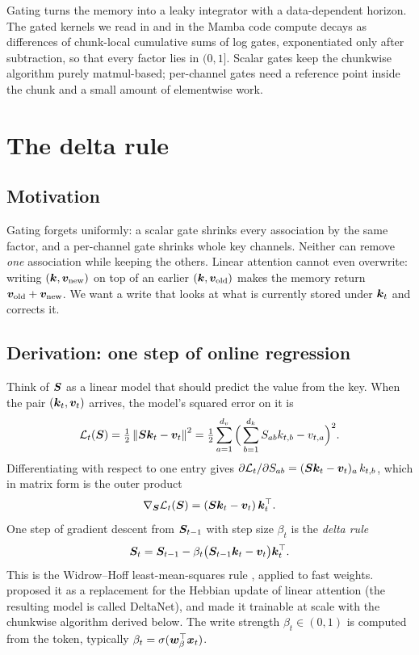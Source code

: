 \begin{keyidea}
Gating turns the memory into a leaky integrator with a data-dependent horizon. The gated kernels
we read in \fla{} and in the Mamba code compute decays as differences of chunk-local cumulative
sums of log gates, exponentiated only after subtraction, so that every factor lies in $(0,1]$. Scalar gates keep
the chunkwise algorithm purely matmul-based; per-channel gates need a reference point inside the
chunk and a small amount of elementwise work.
\end{keyidea}

\section{The delta rule}\label{sec:c03-delta}

\subsection{Motivation}

Gating forgets uniformly: a scalar gate shrinks every association by the same factor, and a
per-channel gate shrinks whole key channels. Neither can remove \emph{one} association while
keeping the others. Linear attention cannot even overwrite: writing $(\bm{k},\bm{v}_{\text{new}})$ on
top of an earlier $(\bm{k},\bm{v}_{\text{old}})$ makes the memory return $\bm{v}_{\text{old}}+\bm{v}_{\text{new}}$.
We want a write that looks at what is currently stored under $\bm{k}_t$ and corrects it.

\subsection{Derivation: one step of online regression}

Think of $\bm{S}$ as a linear model that should predict the value from the key. When the pair
$(\bm{k}_t,\bm{v}_t)$ arrives, the model's squared error on it is
\begin{equation}\label{eq:c03-delta-loss}
  \mathcal{L}_t(\bm{S})=\tfrac12\left\lVert \bm{S}\bm{k}_t-\bm{v}_t\right\rVert^2
  =\tfrac12\sum_{a=1}^{d_v}\Big(\sum_{b=1}^{d_k}S_{ab}k_{t,b}-v_{t,a}\Big)^2 .
\end{equation}
Differentiating with respect to one entry gives
$\partial\mathcal{L}_t/\partial S_{ab}=(\bm{S}\bm{k}_t-\bm{v}_t)_a\,k_{t,b}$, which in matrix form is the outer
product
\[
  \nabla_{\bm{S}}\mathcal{L}_t(\bm{S})=(\bm{S}\bm{k}_t-\bm{v}_t)\,\bm{k}_t^{\top} .
\]
One step of gradient descent from $\bm{S}_{t-1}$ with step size $\beta_t$ is the \emph{delta rule}
\begin{equation}\label{eq:c03-delta}
  \bm{S}_t=\bm{S}_{t-1}-\beta_t\big(\bm{S}_{t-1}\bm{k}_t-\bm{v}_t\big)\bm{k}_t^{\top} .
\end{equation}
This is the Widrow--Hoff least-mean-squares rule \citep{c02-widrow1960adaptive}, applied to fast
weights. \citet{c02-schlag2021linear} proposed it as a replacement for the Hebbian update of
linear attention (the resulting model is called DeltaNet), and \citet{c02-yang2024deltanet} made
it trainable at scale with the chunkwise algorithm derived below. The write strength
$\beta_t\in(0,1)$ is computed from the token, typically $\beta_t=\sigma(\bm{w}_\beta^{\top}\bm{x}_t)$.

